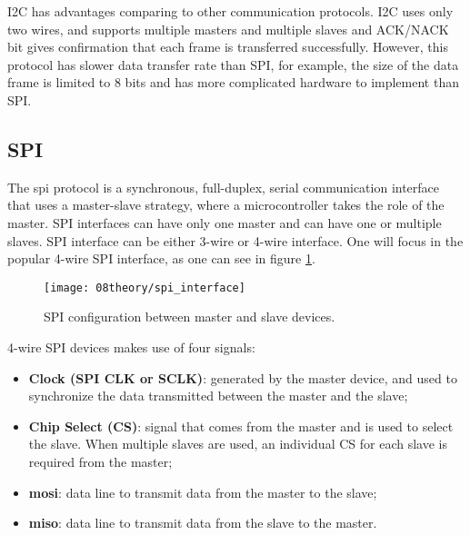 I2C has advantages comparing to other communication protocols. I2C uses only two wires, and supports multiple masters and multiple slaves and ACK/NACK bit gives confirmation that each frame is transferred successfully. However, this protocol has slower data transfer rate than SPI, for example, the size of the data frame is limited to 8 bits and has more complicated hardware to implement than SPI.

%
\clearpage
\subsection{SPI}
The \ac{spi} protocol is a synchronous, full-duplex, serial communication interface that uses a master-slave strategy, where a microcontroller takes the role of the master. SPI interfaces can have only one master and can have one or multiple slaves. SPI interface can be either 3-wire or 4-wire interface. One will focus in the popular 4-wire SPI interface, as one can see in figure \ref{fig:spi_interface}. \cite{spi_interface}

\begin{figure}[H]
	\centering
	\texttt{[image: 08theory/spi\_interface]}
	\caption{SPI configuration between master and slave devices.}
	\label{fig:spi_interface}
\end{figure}

4-wire SPI devices makes use of four signals:
\begin{itemize}
	\item \textbf{Clock (SPI CLK or SCLK)}: generated by the master device, and used to synchronize the data transmitted between the master and the slave;
	\item \textbf{Chip Select (CS)}: signal that comes from the master and is used to select the slave. When multiple slaves are used, an individual CS for each slave is required from the master;
	\item \textbf{\ac{mosi}}: data line to transmit data from the master to the slave;
	\item \textbf{\ac{miso}}: data line to transmit data from the slave to the master.
\end{itemize}

